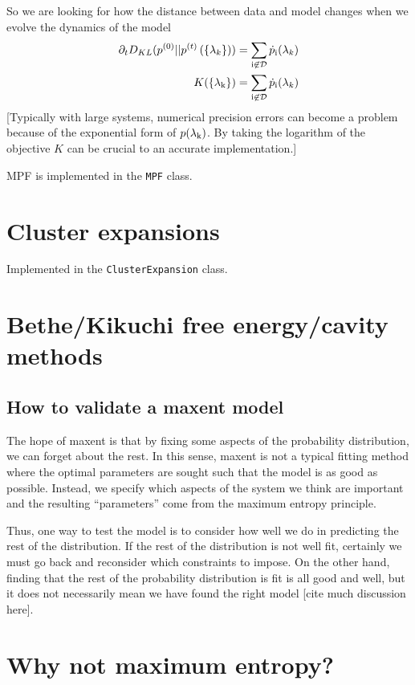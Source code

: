 \documentclass[aps,prl,twocolumn]{revtex4-1}
\begin{document}
So we are looking for how the distance between data and model changes when we evolve the dynamics of the model
\begin{align}
	\partial_t D_{KL}(p^{(0)}||p^{(t)}\left(\{\lambda_k\}\right)) &= \sum_{\rm i \not\in \mathcal{D}} \dot{p}_{\rm i}(\lambda_k)\\
	K(\{\lambda_{\rm k}\}) &= \sum_{\rm i \not\in \mathcal{D}} \dot{p}_{\rm i}(\lambda_k)
\end{align}
[Typically with large systems, numerical precision errors can become a problem because of the exponential form of $p(\lambda_{\rm k})$. By taking the logarithm of the objective $K$ can be crucial to an accurate implementation.]

MPF is implemented in the {\tt MPF} class.

\section{Cluster expansions}
Implemented in the {\tt ClusterExpansion} class.

\section{Bethe/Kikuchi free energy/cavity methods}

\subsection{How to validate a maxent model}
The hope of maxent is that by fixing some aspects of the probability distribution, we can forget about the rest. In this sense, maxent is not a typical fitting method where the optimal parameters are sought such that the model is as good as possible. Instead, we specify which aspects of the system we think are important and the resulting ``parameters'' come from the maximum entropy principle.

Thus, one way to test the model is to consider how well we do in predicting the rest of the distribution. If the rest of the distribution is not well fit, certainly we must go back and reconsider which constraints to impose. On the other hand, finding that the rest of the probability distribution is fit is all good and well, but it does not necessarily mean we have found the right model [cite much discussion here].

\section{Why not maximum entropy?}
\end{document}
